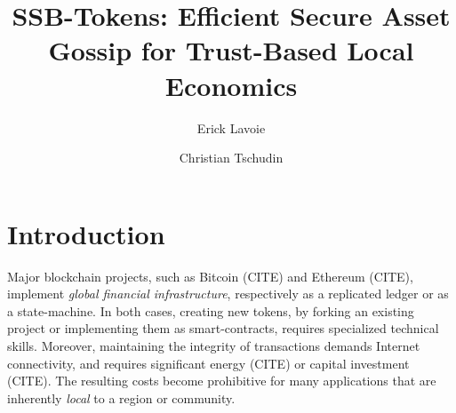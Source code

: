 \documentclass[sigplan,screen,10pt]{acmart}
\begin{document}
\title{SSB-Tokens: Efficient Secure Asset Gossip for Trust-Based Local Economics}

\author{Erick Lavoie}

\author{Christian Tschudin}


\begin{abstract}

\end{abstract}

\maketitle

\section{Introduction}

Major blockchain projects, such as Bitcoin (CITE) and Ethereum (CITE), implement \textit{global financial infrastructure}, respectively as a replicated ledger or as a state-machine. In both cases, creating new tokens, by forking an existing project or implementing them as smart-contracts, requires specialized technical skills. Moreover, maintaining the integrity of transactions demands Internet connectivity, and requires significant energy (CITE) or capital investment (CITE). The resulting costs become prohibitive for many applications that are inherently \textit{local} to a region or community.
\end{document}
